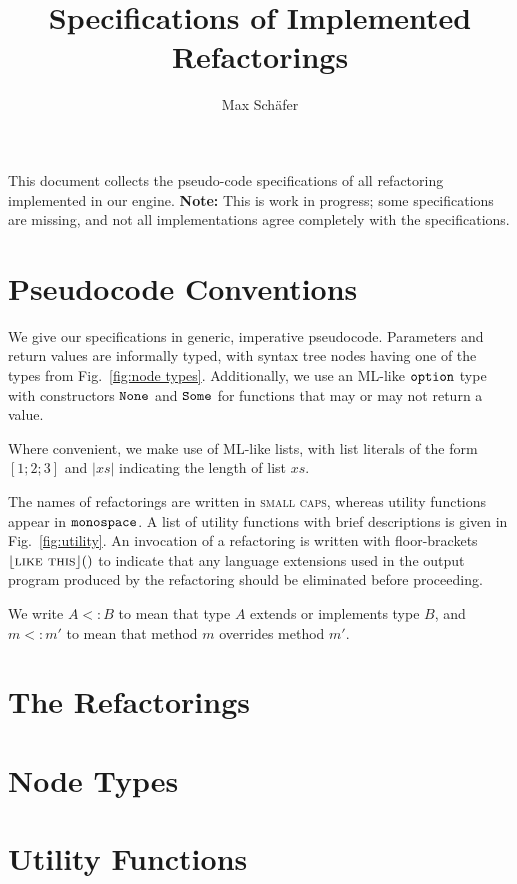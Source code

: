 \documentclass{article}
\title{Specifications of Implemented Refactorings}
\author{Max Sch\"afer}
\newcommand{\refactoring}[1]{\textsc{#1}}
\newcommand{\util}[1]{\ensuremath{\text{\texttt{#1}}}}
\begin{document}
\maketitle

This document collects the pseudo-code specifications of all refactoring implemented in our engine. \textbf{Note:} This is work in progress; some specifications are missing, and not all implementations agree completely with the specifications.

\section{Pseudocode Conventions}
We give our specifications in generic, imperative pseudocode. Parameters and return values are informally typed, with syntax tree nodes having one of the types from Fig.~\ref{fig:node types}. Additionally, we use an ML-like \util{option} type with constructors \util{None} and \util{Some} for functions that may or may not return a value.

Where convenient, we make use of ML-like lists, with list literals of the form $[1; 2; 3]$ and $|xs|$ indicating the length of list $xs$.

The names of refactorings are written in \refactoring{small caps}, whereas utility functions appear in \util{monospace}. A list of utility functions with brief descriptions is given in Fig.~\ref{fig:utility}. An invocation of a refactoring is written with floor-brackets $\lfloor\refactoring{like this}\rfloor()$ to indicate that any language extensions used in the output program produced by the refactoring should be eliminated before proceeding.

We write $A<:B$ to mean that type $A$ extends or implements type $B$, and $m<:m'$ to mean that method $m$ overrides method $m'$.

\section{The Refactorings}
























\section{Node Types}


\section{Utility Functions}


\listofalgorithms
\end{document}
